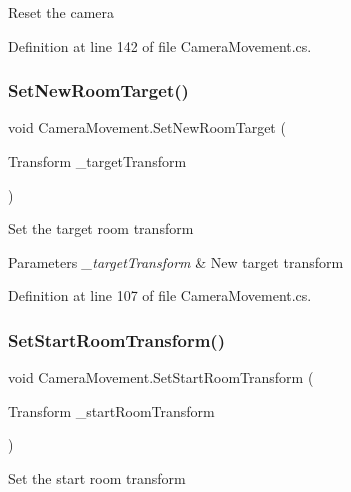 Reset the camera 



Definition at line 142 of file Camera\+Movement.\+cs.

\mbox{\label{class_camera_movement_a198122a1f8e338c1bfe843a0f4f6ce96}} 
\subsubsection{\texorpdfstring{Set\+New\+Room\+Target()}{SetNewRoomTarget()}}
{\footnotesize\ttfamily void Camera\+Movement.\+Set\+New\+Room\+Target (\begin{DoxyParamCaption}\item[{Transform}]{\+\_\+target\+Transform }\end{DoxyParamCaption})}



Set the target room transform 


\begin{DoxyParams}{Parameters}
{\em \+\_\+target\+Transform} & New target transform\\
\hline
\end{DoxyParams}


Definition at line 107 of file Camera\+Movement.\+cs.

\mbox{\label{class_camera_movement_a22e6e76309d99376ead5b3dffd474938}} 
\subsubsection{\texorpdfstring{Set\+Start\+Room\+Transform()}{SetStartRoomTransform()}}
{\footnotesize\ttfamily void Camera\+Movement.\+Set\+Start\+Room\+Transform (\begin{DoxyParamCaption}\item[{Transform}]{\+\_\+start\+Room\+Transform }\end{DoxyParamCaption})}



Set the start room transform 



